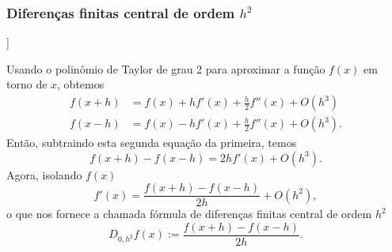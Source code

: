 \subsubsection{Diferenças finitas central de ordem $h^2$}

\begin{flushleft}
  [[tag:revisar]]
\end{flushleft}

Usando o polinômio de Taylor de grau 2 para aproximar a função $f(x)$ em torno de $x$, obtemos
\begin{align}
  f(x+h) &= f(x) + hf'(x) + \frac{h}{2}f''(x) + O(h^3)\\
  f(x-h) &= f(x) - hf'(x) + \frac{h}{2}f''(x) + O(h^3).
\end{align}
Então, subtraindo esta segunda equação da primeira, temos
\begin{equation}
  f(x+h)-f(x-h) = 2hf'(x) + O(h^3).
\end{equation}
Agora, isolando $f(x)$
\begin{equation}
  f'(x) = \frac{f(x+h)-f(x-h)}{2h} + O(h^2),
\end{equation}
o que nos fornece a chamada fórmula de diferenças finitas central de ordem $h^2$
\begin{equation}\label{eq:dfc_h2}
  D_{0,h^2}f(x) := \frac{f(x+h)-f(x-h)}{2h}.
\end{equation}

